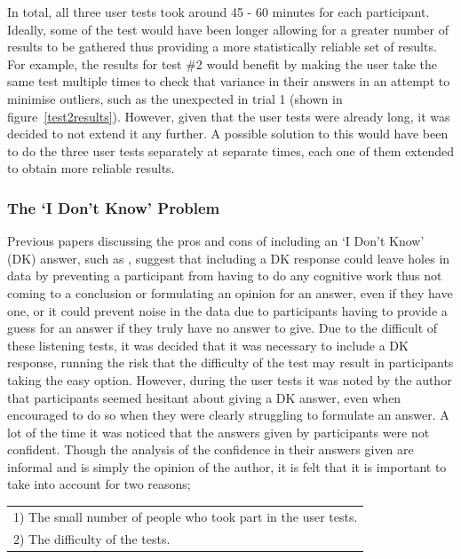 \documentclass[../../main.tex]{subfiles}
\begin{document}
				In total, all three user tests took around 45 - 60 minutes for each participant. Ideally, some of the test would have been longer allowing for a greater number of results to be gathered thus providing a more statistically reliable set of results. For example, the results for test \#2 would benefit by making the user take the same test multiple times to check that variance in their answers in an attempt to minimise outliers, such as the unexpected in trial 1 (shown in figure~\ref{test2results}). However, given that the user tests were already long, it was decided to not extend it any further. A possible solution to this would have been to do the three user tests separately at separate times, each one of them extended to obtain more reliable results.


			\subsubsection{The `I Don't Know' Problem}
				Previous papers discussing the pros and cons of including an `I Don't Know' (DK) answer, such as \cite{DK}, suggest that including a DK response could leave holes in data by preventing a participant from having to do any cognitive work thus not coming to a conclusion or formulating an opinion for an answer, even if they have one, or it could prevent noise in the data due to participants having to provide a guess for an answer if they truly have no answer to give. Due to the difficult of these listening tests, it was decided that it was necessary to include a DK response, running the risk that the difficulty of the test may result in participants taking the easy option. However, during the user tests it was noted by the author that participants seemed hesitant about giving a DK answer, even when encouraged to do so when they were clearly struggling to formulate an answer. A lot of the time it was noticed that the answers given by participants were not confident. Though the analysis of the confidence in their answers given are informal and is simply the opinion of the author, it is felt that it is important to take into account for two reasons;

				\vspace{2mm}
				\begin{tabular}{l}
				1) The small number of people who took part in the user tests.\\
				2) The difficulty of the tests.
				\end{tabular}
				\vspace{2mm}
\end{document}
